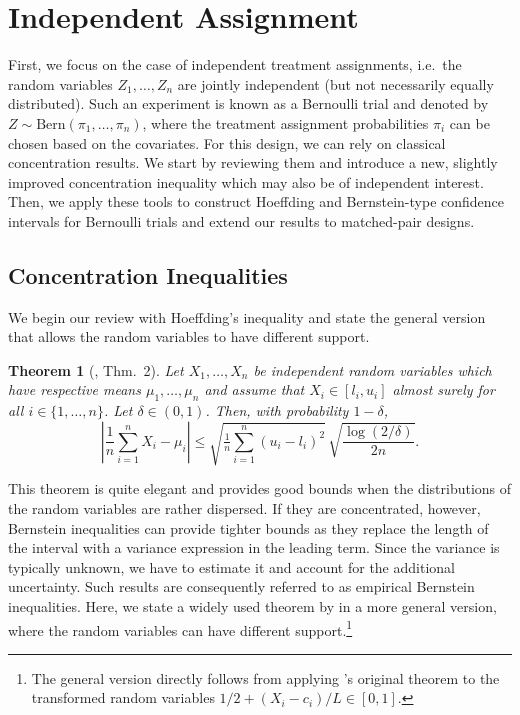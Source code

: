 \documentclass[aos]{imsart2}
\theoremstyle{plain}
\newtheorem{theorem}{Theorem}[section]
\theoremstyle{definition}
\newcommand{\bern}{\mathrm{Bern}}
\begin{document}
\section{Independent Assignment}\label{sec:bernoulli}
First, we focus on the case of independent treatment assignments, i.e.\ the random variables $Z_1,\ldots,Z_n$ are jointly independent (but not necessarily equally distributed). Such an experiment is known as a Bernoulli trial and denoted by $Z \sim \bern(\pi_1,\ldots,\pi_n)$, where the treatment assignment probabilities $\pi_i$ can be chosen based on the covariates. For this design, we can rely on classical concentration results. We start by reviewing them and introduce a new, slightly improved concentration inequality which may also be of independent interest. Then, we apply these tools to construct Hoeffding and Bernstein-type confidence intervals for Bernoulli trials and extend our results to matched-pair designs.

\subsection{Concentration Inequalities} We begin our review with Hoeffding's inequality and state the general version that allows the random variables to have different support.
\begin{theorem}[\cite{hoeffding_probability_1963}, Thm.~2]\label{thm:hoeffding}
    Let $X_1,\ldots,X_n$ be independent random variables which have respective means $\mu_1,\ldots,\mu_n$ and assume that $X_i \in [l_i,u_i]$ almost surely for all $i\in\{1,\ldots,n\}$. Let $\delta \in (0,1)$. Then, with probability $1-\delta$,
    \begin{equation*}
        \left\vert \frac{1}{n}\sum_{i=1}^n X_i-\mu_i \right\vert \leq \sqrt{\tfrac{1}{n}{\textstyle\sum_{i=1}^n  (u_i-l_i)^2}}\,\sqrt{\frac{\log(2/\delta)}{2n}}.
    \end{equation*}
\end{theorem}
This theorem is quite elegant and provides good bounds when the distributions of the random variables are rather dispersed. If they are concentrated, however, Bernstein inequalities \citep{bernstein1924,bernstein1946} can provide tighter bounds as they replace the length of the interval with a variance expression in the leading term. Since the variance is typically unknown, we have to estimate it and account for the additional uncertainty. Such results are consequently referred to as empirical Bernstein inequalities. Here, we state a widely used theorem by \citeauthor{maurer_empirical_2009} in a more general version, where the random variables can have different support.\footnote{The general version directly follows from applying \citeauthor{maurer_empirical_2009}'s original theorem to the transformed random variables $1/2+(X_i-c_i)/L \in [0,1]$.}
\end{document}
